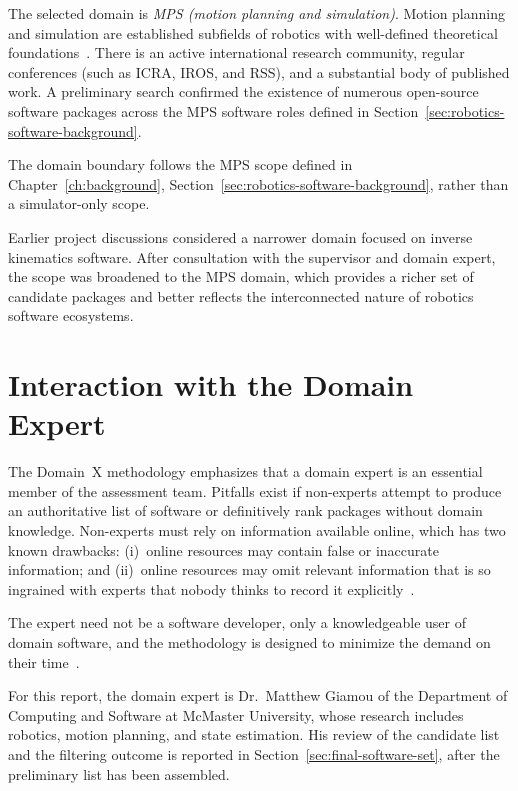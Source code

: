 The selected domain is \emph{MPS (motion planning and simulation)}. Motion planning and simulation are established subfields of robotics with well-defined theoretical foundations~\citep{lavalle2006planning,choset2005principles}. There is an active international research community, regular conferences (such as ICRA, IROS, and RSS), and a substantial body of published work. A preliminary search confirmed the existence of numerous open-source software packages across the MPS software roles defined in Section~\ref{sec:robotics-software-background}.

The domain boundary follows the MPS scope defined in Chapter~\ref{ch:background}, Section~\ref{sec:robotics-software-background}, rather than a simulator-only scope.

Earlier project discussions considered a narrower domain focused on inverse kinematics software. After consultation with the supervisor and domain expert, the scope was broadened to the MPS domain, which provides a richer set of candidate packages and better reflects the interconnected nature of robotics software ecosystems.

\section{Interaction with the Domain Expert}
\label{sec:domain-expert-interaction}

The Domain~X methodology emphasizes that a domain expert is an essential member of the assessment team. Pitfalls exist if non-experts attempt to produce an authoritative list of software or definitively rank packages without domain knowledge. Non-experts must rely on information available online, which has two known drawbacks: (i)~online resources may contain false or inaccurate information; and (ii)~online resources may omit relevant information that is so ingrained with experts that nobody thinks to record it explicitly~\citep{Smith2021}.

The expert need not be a software developer, only a knowledgeable user of domain software, and the methodology is designed to minimize the demand on their time~\citep{Smith2024MI}.

For this report, the domain expert is Dr.~Matthew Giamou of the Department of Computing and Software at McMaster University, whose research includes robotics, motion planning, and state estimation. His review of the candidate list and the filtering outcome is reported in Section~\ref{sec:final-software-set}, after the preliminary list has been assembled.

